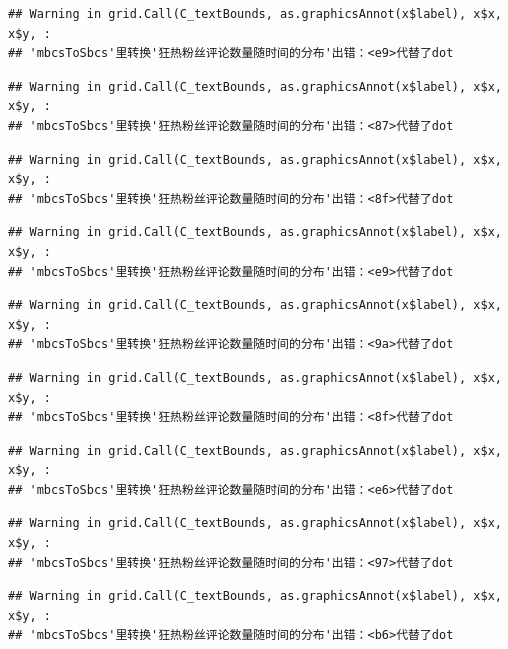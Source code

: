 \documentclass[
]{article}
\begin{document}
\begin{verbatim}
## Warning in grid.Call(C_textBounds, as.graphicsAnnot(x$label), x$x, x$y, :
## 'mbcsToSbcs'里转换'狂热粉丝评论数量随时间的分布'出错：<e9>代替了dot
\end{verbatim}

\begin{verbatim}
## Warning in grid.Call(C_textBounds, as.graphicsAnnot(x$label), x$x, x$y, :
## 'mbcsToSbcs'里转换'狂热粉丝评论数量随时间的分布'出错：<87>代替了dot
\end{verbatim}

\begin{verbatim}
## Warning in grid.Call(C_textBounds, as.graphicsAnnot(x$label), x$x, x$y, :
## 'mbcsToSbcs'里转换'狂热粉丝评论数量随时间的分布'出错：<8f>代替了dot
\end{verbatim}

\begin{verbatim}
## Warning in grid.Call(C_textBounds, as.graphicsAnnot(x$label), x$x, x$y, :
## 'mbcsToSbcs'里转换'狂热粉丝评论数量随时间的分布'出错：<e9>代替了dot
\end{verbatim}

\begin{verbatim}
## Warning in grid.Call(C_textBounds, as.graphicsAnnot(x$label), x$x, x$y, :
## 'mbcsToSbcs'里转换'狂热粉丝评论数量随时间的分布'出错：<9a>代替了dot
\end{verbatim}

\begin{verbatim}
## Warning in grid.Call(C_textBounds, as.graphicsAnnot(x$label), x$x, x$y, :
## 'mbcsToSbcs'里转换'狂热粉丝评论数量随时间的分布'出错：<8f>代替了dot
\end{verbatim}

\begin{verbatim}
## Warning in grid.Call(C_textBounds, as.graphicsAnnot(x$label), x$x, x$y, :
## 'mbcsToSbcs'里转换'狂热粉丝评论数量随时间的分布'出错：<e6>代替了dot
\end{verbatim}

\begin{verbatim}
## Warning in grid.Call(C_textBounds, as.graphicsAnnot(x$label), x$x, x$y, :
## 'mbcsToSbcs'里转换'狂热粉丝评论数量随时间的分布'出错：<97>代替了dot
\end{verbatim}

\begin{verbatim}
## Warning in grid.Call(C_textBounds, as.graphicsAnnot(x$label), x$x, x$y, :
## 'mbcsToSbcs'里转换'狂热粉丝评论数量随时间的分布'出错：<b6>代替了dot
\end{verbatim}
\end{document}
